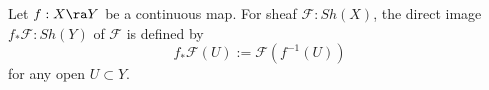 %

\begin{definition}
    Let $f : X \ra Y$ be a continuous map.
    For sheaf $\mathscr{F} : Sh (X)$,
    the direct image $f_* \mathscr{F} : Sh (Y)$
    of $\mathscr{F}$
    is defined by
    \begin{equation}
        f_* \mathscr{F} (U) := \mathscr{F} (f^{-1} (U))
    \end{equation}
    for any open $U \subset Y$.
\end{definition}